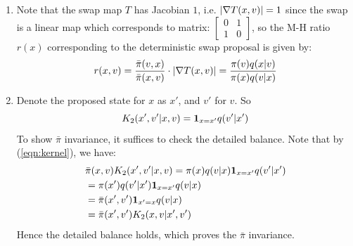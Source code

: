 \documentclass{article}
\begin{document}
\begin{enumerate}
\item 
Note that the swap map $T$ has Jacobian $1$, i.e. $\left|\nabla T(x, v)\right| = 1$ since the swap is a linear map which corresponds to matrix: $\begin{bmatrix}
0 & 1\\
1 & 0
\end{bmatrix}$, so the M-H ratio $r(x)$ corresponding to the deterministic swap proposal is given by:
\begin{equation}
r(x,v) = \frac{\bar{\pi}(v, x)}{\bar{\pi}(x, v)} \cdot \left|\nabla T(x, v)\right|= \frac{\pi(v)q(x | v)}{\pi(x)q(v | x)} 
\end{equation}

\item 
Denote the proposed state for $x$ as $x'$, and $v'$ for $v$. So 
\begin{equation}
K_2(x', v'|x, v) = {\mathbf 1}_{x=x'}q(v' | x') \label{eqn:kernel}
\end{equation}
To show $\bar{\pi}$ invariance, it suffices to check the detailed balance. Note that by (\ref{eqn:kernel}), we have:
\begin{align*}
& \bar{\pi}(x, v) K_2(x',v'|x,v) = \pi(x)q(v | x) {\mathbf 1}_{x = x'} q(v'|x')\\
& = \pi(x')q(v'|x') {\mathbf 1}_{x = x'} q(v | x)\\
& = \bar{\pi}(x', v') {\mathbf 1}_{x' = x} q(v | x)\\
& = \bar{\pi}(x', v') K_2(x, v|x',v')
\end{align*}
Hence the detailed balance holds, which proves the $\bar{\pi}$ invariance.
\end{enumerate}
    
\end{document}
